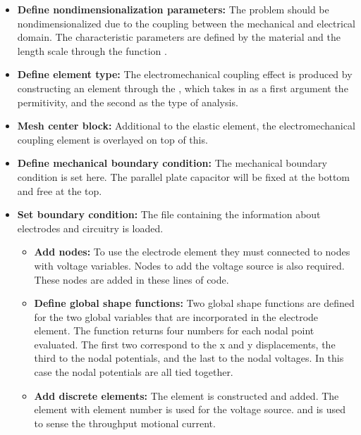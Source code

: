 \begin{itemize}

  \item{\textbf{Define nondimensionalization parameters:}}
  The problem should be nondimensionalized due to the coupling
  between the mechanical and electrical domain. The characteristic
  parameters are defined by the material  and the 
  length scale  through the function .

  \item{\textbf{Define element type:}}
  The electromechanical coupling effect is produced by 
  constructing an element through the ,
  which takes in as a first argument the permitivity, and the second
  as the type of analysis.

  \item{\textbf{Mesh center block:}}
  Additional to the elastic element, the electromechanical 
  coupling element is overlayed on top of this.

  \item{\textbf{Define mechanical boundary condition:}}
  The mechanical boundary condition is set here. The parallel
  plate capacitor will be fixed at the bottom and free at the
  top.

  \item{\textbf{Set boundary condition:}}
  The file  containing
  the information about electrodes and circuitry is loaded.
  \begin{itemize}

     \item{\textbf{Add nodes:}}
     To use the electrode element they must connected to nodes 
     with voltage variables. Nodes to add the voltage source is 
     also required. These nodes are added in these lines
     of code.

     \item{\textbf{Define global shape functions:}}
     Two global shape functions are defined for the two global
     variables that are incorporated in the electrode element.
     The function returns four numbers for each nodal point 
     evaluated. The first two correspond to the x and y displacements,
     the third to the nodal potentials, and the last to the nodal
     voltages. In this case the nodal potentials are all tied 
     together.

     \item{\textbf{Add discrete elements:}}
     The  element is constructed and added. The
     element with element number  is used
     for the voltage source. and  is used
     to sense the throughput motional current.


\end{itemize}
\end{itemize}
